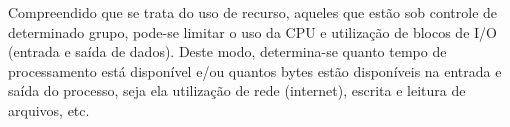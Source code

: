 Compreendido que se trata do uso de recurso, aqueles que estão sob controle de determinado grupo, pode-se limitar o uso da CPU e utilização de blocos de I/O (entrada e saída de dados). Deste modo, determina-se quanto tempo de processamento está disponível e/ou quantos bytes estão disponíveis na entrada e saída do processo, seja ela utilização de rede (internet), escrita e leitura de arquivos, etc.


